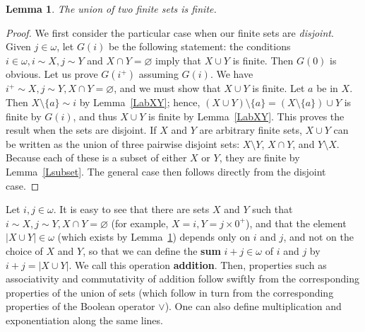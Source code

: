 \documentclass[12pt,letterpaper]{article}
\newtheorem{lem}[thm]{Lemma} %
\begin{document}
\begin{lem}\label{Lunion} 
The union of two finite sets is finite. 
\end{lem} 
\begin{proof} 
We first consider the particular case when our finite sets are \emph{disjoint}. Given \(j\in\omega\), let \(G(i)\) be the following statement: the conditions \(i\in\omega,i\sim X,j\sim Y\) and \(X\cap Y=\varnothing\) imply that \(X\cup Y\) is finite. Then \(G(0)\) is obvious. Let us prove \(G(i^+)\) assuming \(G(i)\). We have \(i^+\sim X,j\sim Y,X\cap Y=\varnothing\), and we must show that \(X\cup Y\) is finite. Let \(a\) be in \(X\). Then \(X\setminus\{a\}\sim i\) by Lemma~\ref{LabXY}; hence, \((X\cup Y)\setminus\{a\}=(X\setminus\{a\})\cup Y\) is finite by \(G(i)\), and thus \(X\cup Y\) is finite by Lemma~\ref{LabXY}. This proves the result when the sets are disjoint. If \(X\) and \(Y\) are arbitrary finite sets, \(X \cup Y\) can be written as the union of three pairwise disjoint sets: \(X \setminus Y\), \(X \cap Y\), and \(Y\setminus X\). Because each of these is a subset of either \(X\) or \(Y\), they are finite by Lemma~\ref{Lsubset}. The general case then follows directly from the disjoint case. 
\end{proof} 

Let \(i,j\in\omega\). It is easy to see that there are sets \(X\) and \(Y\) such that \(i\sim X,j\sim Y, X\cap Y=\varnothing\) (for example, \(X=i,Y=j\times 0^+\)), and that the element \(|X\cup Y|\in\omega\) (which exists by Lemma~\ref{Lunion}) depends only on \(i\) and \(j\), and not on the choice of \(X\) and \(Y\), so that we can define the \textbf{sum} \(i+j\in\omega\) of \(i\) and \(j\) by \(i+j=|X\cup Y|\). We call this operation \textbf{addition}. Then, properties such as associativity and commutativity of addition follow swiftly from the corresponding properties of the union of sets (which follow in turn from the corresponding properties of the Boolean operator \(\lor\)). One can also define multiplication and exponentiation along the same lines. 

\printbibliography
\end{document}
